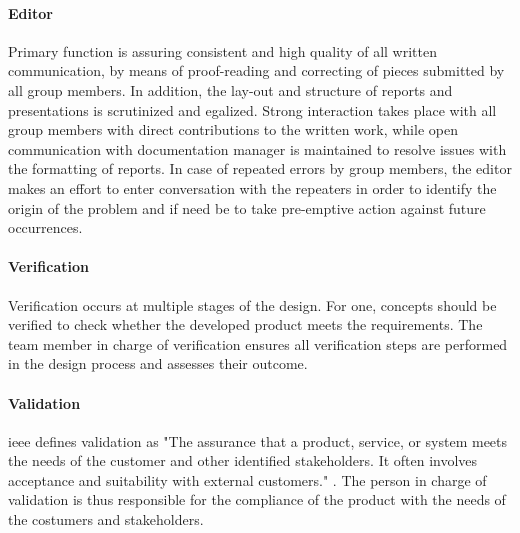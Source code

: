 \paragraph{Editor}
Primary function is assuring consistent and high quality of all written communication, by means of proof-reading and correcting of pieces submitted by all group members. In addition, the lay-out and structure of reports and presentations is scrutinized and egalized. Strong interaction takes place with all group members with direct contributions to the written work, while open communication with documentation manager is maintained to resolve issues with the formatting of reports. In case of repeated errors by group members, the editor makes an effort to enter conversation with the repeaters in order to identify the origin of the problem and if need be to take pre-emptive action against future occurrences.
\paragraph{Verification}
Verification occurs at multiple stages of the design. For one, concepts should be verified to check whether the developed product meets the requirements. The team member in charge of verification ensures all verification steps are performed in the design process and assesses their outcome.

\paragraph{Validation}
\gls{ieee} defines validation as "The assurance that a product, service, or system meets the needs of the customer and other identified stakeholders. It often involves acceptance and suitability with external customers." \cite[p.452]{IEEE}. The person in charge of validation is thus responsible for the compliance of the product with the needs of the costumers and stakeholders.

